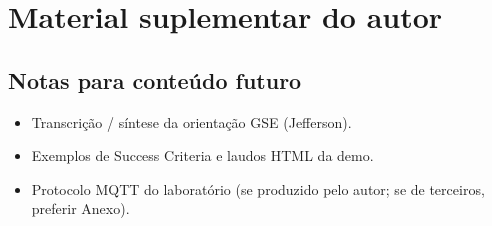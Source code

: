 \chapter{Material suplementar do autor}
\label{ap:suplementar}


\section{Notas para conteúdo futuro}

\begin{itemize}
  \item Transcrição / síntese da orientação GSE (Jefferson).
  \item Exemplos de Success Criteria e laudos HTML da demo.
  \item Protocolo MQTT do laboratório (se produzido pelo autor; se de terceiros, preferir Anexo).
\end{itemize}
